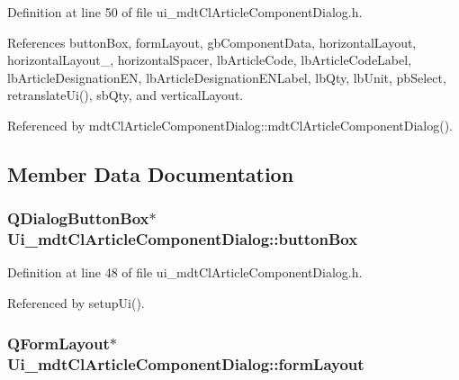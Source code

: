 Definition at line 50 of file ui\-\_\-mdt\-Cl\-Article\-Component\-Dialog.\-h.



References button\-Box, form\-Layout, gb\-Component\-Data, horizontal\-Layout, horizontal\-Layout\-\_, horizontal\-Spacer, lb\-Article\-Code, lb\-Article\-Code\-Label, lb\-Article\-Designation\-E\-N, lb\-Article\-Designation\-E\-N\-Label, lb\-Qty, lb\-Unit, pb\-Select, retranslate\-Ui(), sb\-Qty, and vertical\-Layout.



Referenced by mdt\-Cl\-Article\-Component\-Dialog\-::mdt\-Cl\-Article\-Component\-Dialog().



\subsection{Member Data Documentation}
\hypertarget{class_ui__mdt_cl_article_component_dialog_a00c3ea8ad19edee72b7d89a3a73cdfe1}{
\subsubsection[{button\-Box}]{\setlength{\rightskip}{0pt plus 5cm}Q\-Dialog\-Button\-Box$\ast$ Ui\-\_\-mdt\-Cl\-Article\-Component\-Dialog\-::button\-Box}}\label{class_ui__mdt_cl_article_component_dialog_a00c3ea8ad19edee72b7d89a3a73cdfe1}


Definition at line 48 of file ui\-\_\-mdt\-Cl\-Article\-Component\-Dialog.\-h.



Referenced by setup\-Ui().

\hypertarget{class_ui__mdt_cl_article_component_dialog_af78d852c4134103f3e3a3d60ea082468}{
\subsubsection[{form\-Layout}]{\setlength{\rightskip}{0pt plus 5cm}Q\-Form\-Layout$\ast$ Ui\-\_\-mdt\-Cl\-Article\-Component\-Dialog\-::form\-Layout}}\label{class_ui__mdt_cl_article_component_dialog_af78d852c4134103f3e3a3d60ea082468}


